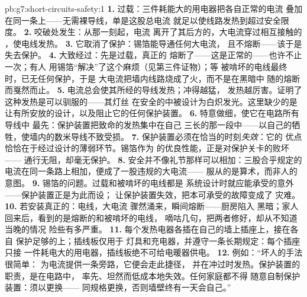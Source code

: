 \begin{solution}{pb:g7:short-circuits-safety:1}
\textbf{1.} 过载：三件耗能大的用电器把各自正常的电流
叠加在同一条上——无需裸导线，单是这股总电流
就足以使线路发热到超过安全限度。
\textbf{2.} 咬破处发生：从那一刻起，电流
离开了其后方的，大电流穿过相互接触的
，使电线发热。
\textbf{3.} 它取消了保护：锡箔能导通任何大电流，
且不熔断——该于是失去保护。
\textbf{4.} 大致经过：先是过载，真正的
熔断了——这是正常的——也许不止一次；有人
用锡箔“解决”了这个麻烦（见第三件证物）；等
被啃坏的电线最终时，已无任何保护，于是
大电流把墙内线路烧成了火，而不是在黑暗中
随的熔断而戛然而止。
\textbf{5.} 电流总会使其所经的导线发热；冲得越猛，
发热越厉害。证明了这种发热是可以驯服的——其灯丝
在安全的中被设计为白炽发光。这里缺少的是
让有所安放的设计，以及阻止它的任何保护装置。
\textbf{6.} 特意做细，使它在电路所有导线中
最先：保护装置把致命的发热集中在自己
三长的那一段中——以自己的牺牲，使墙内的数米导线不致受损。
\textbf{7.} 保护装置必须在恰当的时刻\emph{失效}：它的
优点恰恰在于经过设计的薄弱环节。锡箔作为
的优良性能，正是对保护关卡的败坏——
通行无阻，却毫无保护。
\textbf{8.} 安全并不像礼节那样可以相加：三股合乎规定的
电流在同一条路上相加，便成了一股违规的大电流——
服从的是算术，而非人的意图。
\textbf{9.} 锡箔的问题。过载和被啃坏的电线都是
系统设计时就应能承受的意外——保护装置正是为此而设；
让保护装置失效，把本可承受的故障变成了
灾难。
\textbf{10.} 若安装真正的：电线，大电流
骤然涌来，瞬间熔断——厨房陷入
黑暗；家人回来后，看到的是熔断的和被啃坏的电线，
嘀咕几句，把两者修好，却从不知道当晚的情况
险些有多严重。
\textbf{11.} 每个发热电器各插在自己的墙上插座上，接在各自
保护足够的上；插线板仅用于
灯具和充电器，并遵守一条长期规定：每个插座只接
一件耗电大的用电器，插线板绝不可给电暖器供电。
\textbf{12.} 例如：“坏人的手法很简单：
为电流提供一条旁路，它便会走此捷径，
并在冲过时发热。保护装置的职责，是在电路中，
率先、坦然而低成本地失效。任何家庭都不得
随意自制保护装置：须以更换——
同规格更换，否则墙壁终有一天会自己。”
\end{solution}

